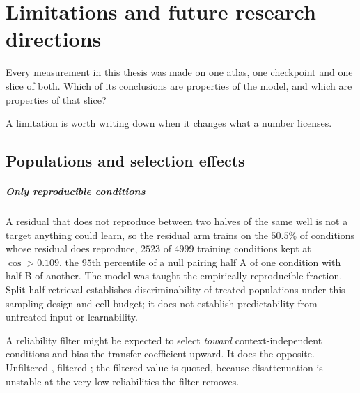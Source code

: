 
\chapter{Limitations and future research directions}
\label{sec:limitations}

\begin{question}
Every measurement in this thesis was made on one atlas, one checkpoint and one
slice of both. Which of its conclusions are properties of the model, and which
are properties of that slice?
\end{question}

\noindent
A limitation is worth writing down when it changes what a number licenses.

\section{Populations and selection effects}
\label{sec:lim-population}

\paragraph{Only reproducible conditions} A residual that does not reproduce
between two halves of the same well is not a target anything could learn, so the
residual arm trains on the $50.5\%$ of conditions whose residual does reproduce,
$\num{2523}$ of $\num{4999}$ training conditions kept at $\cos > 0.109$, the
$95$th percentile of a null pairing half A of one condition with half B of
another. The model was taught the
empirically reproducible fraction. Split-half retrieval establishes
discriminability of treated populations under this sampling design and cell
budget; it does not establish predictability from untreated input or
learnability.

A reliability filter might be expected to select \emph{toward}
context-in\-de\-pen\-dent conditions and bias the transfer coefficient upward.
It does the opposite. Unfiltered , filtered
; the filtered value is quoted, because disattenuation
is unstable at the very low reliabilities the filter removes.

